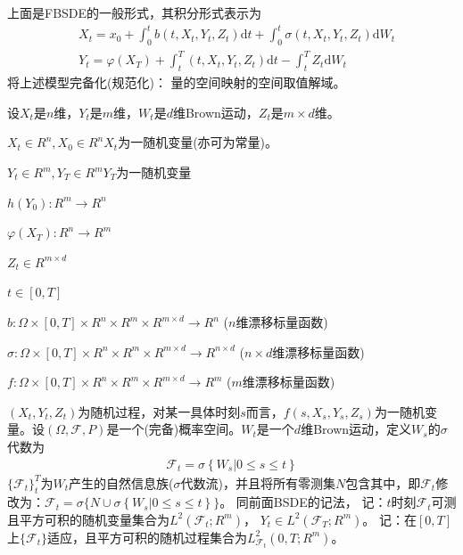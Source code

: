 		上面是FBSDE的一般形式，其积分形式表示为
		\begin{align*}
		& {X_t} = {x_0} + \int_0^t {b\left( {t,{X_t},{Y_t},{Z_t}} \right)\mathrm{d}t + \int_0^t {\sigma \left( {t,{X_t},{Y_t},{Z_t}} \right)\mathrm{d}{W_t}} } \\
		& {Y_t} = \varphi(X_T) + \int_t^T {\left( {t,{X_t},{Y_t},{Z_t}} \right)\mathrm{d}t }-{ \int_t^T {Z_t}\mathrm{d}{W_t}}  \end{align*}
		将上述模型完备化(规范化)： 量的空间映射的空间取值解域。
		\par
		设$X_t$是$n$维，$Y_t$是$m$维，$W_t$是$d$维Brown运动，$Z_t$是$m \times d$维。
		\par
		${X_t} \in {R^n},{X_0} \in {R^n}$\qquad$X_t$为一随机变量(亦可为常量)。
		\par
		${Y_t} \in {R^m},{Y_T} \in {R^m}$\qquad$Y_T$为一随机变量
		\par
		$h(Y_0):{R^m}\rightarrow{R^n}$
		\par
		 $\varphi(X_T):{R^n}\rightarrow{R^m}$
		\par
		$Z_t\in R^{m\times d}$
		\par
		$t\in [0,T]$
		\par
		$b:\Omega \times  [0,T]\times R^n \times R^m \times R^{m\times d}  \longrightarrow R^n $  \qquad ($n$维漂移标量函数)
		\par
		$\sigma :\Omega \times  [0,T]\times R^n \times R^m \times R^{m\times d}  \longrightarrow R^{n\times d} $ ($n\times d$维漂移标量函数)
		\par
		${f} :\Omega \times  [0,T]\times R^n \times R^m \times R^{m\times d}  \longrightarrow R^{m} $  \qquad ($m$维漂移标量函数)
		\par
		$(X_t,Y_t,Z_t)$为随机过程，对某一具体时刻$s$而言，$f(s,X_s,Y_s,Z_s)$为一随机变量。设$(\Omega,{\mathcal {F}},P)$是一个(完备)概率空间。${W}_t$是一个$d$维Brown运动，定义$W_s$的$\sigma$代数为
		\begin{align*}
		{{\mathcal {F}}_t} = \sigma \left\{ {{W_s}|0 \leqslant s \leqslant t} \right\}\end{align*}
		${\{{{\mathcal {F}}_t}  \}_t^T}$为$W_t$产生的自然信息族($\sigma$代数流)，并且将所有零测集$N$包含其中，即${{\mathcal {F}}_t}$修改为：${{\mathcal {F}}_t} =\sigma\{N\cup \sigma \left\{ {{W_s}|0 \leqslant s \leqslant t} \right\}\}$。
		同前面BSDE的记法，
		记：$t$时刻${{\mathcal {F}}_t}$可测且平方可积的随机变量集合为$L^2({\mathcal{F}_t};R^m) $， ${Y_t} \in L^2({\mathcal{F}_T};{R^m}) $。
		记：在$[0,T]$上$\{{\mathcal {F}}_t\}$适应，且平方可积的随机过程集合为$L_{\mathcal{F}_t} ^2(0,T;R^m) $。
